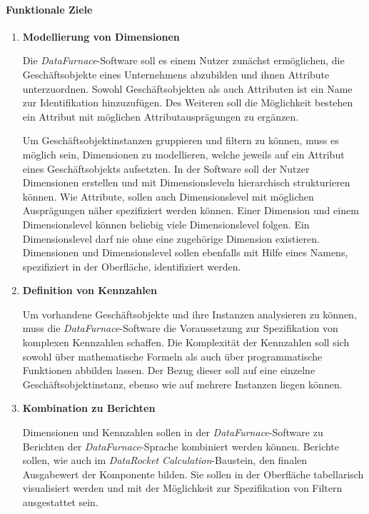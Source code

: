 \documentclass[
  language=german, %
  type=bachelor%
]{isthesis}
\begin{document}
\begin{content}
  \paragraph{Funktionale Ziele}
  \begin{enumerate}
    \item \textbf{Modellierung von Dimensionen}

      Die \textit{DataFurnace}-Software soll es einem Nutzer zunächst
      ermöglichen, die Geschäftsobjekte eines Unternehmens abzubilden und ihnen
      Attribute unterzuordnen. Sowohl Geschäftsobjekten als auch Attributen
      ist ein Name zur Identifikation hinzuzufügen. Des Weiteren soll die
      Möglichkeit bestehen ein Attribut mit möglichen Attributausprägungen zu
      ergänzen.

      Um Geschäftsobjektinstanzen gruppieren und filtern zu können, muss es
      möglich sein, Dimensionen zu modellieren, welche jeweils auf ein Attribut
      eines Geschäftsobjekts aufsetzten. In der Software soll der Nutzer
      Dimensionen erstellen und mit Dimensionsleveln hierarchisch strukturieren
      können. Wie Attribute, sollen auch Dimensionslevel mit möglichen
      Ausprägungen näher spezifiziert werden können. Einer Dimension und einem
      Dimensionslevel können beliebig viele Dimensionslevel folgen. Ein
      Dimensionslevel darf nie ohne eine zugehörige Dimension existieren.
      Dimensionen und Dimensionslevel sollen ebenfalls mit Hilfe eines Namens,
      spezifiziert in der Oberfläche, identifiziert werden.

    \item \textbf{Definition von Kennzahlen}

      Um vorhandene Geschäftsobjekte und ihre Instanzen analysieren zu können,
      muss die \textit{DataFurnace}-Software die Voraussetzung zur
      Spezifikation von komplexen Kennzahlen schaffen. Die Komplexität der
      Kennzahlen soll sich sowohl über mathematische Formeln als auch
      über programmatische Funktionen abbilden lassen. Der Bezug dieser soll auf
      eine einzelne Geschäftsobjektinstanz, ebenso wie auf mehrere Instanzen
      liegen können.

    \item \textbf{Kombination zu Berichten}

      Dimensionen und Kennzahlen sollen in der \textit{DataFurnace}-Software zu
      Berichten der \textit{DataFurnace}-Sprache kombiniert werden können.
      Berichte sollen, wie auch im \textit{DataRocket}
      \textit{Calculation}-Baustein, den finalen Ausgabewert der Komponente
      bilden. Sie sollen in der Oberfläche tabellarisch visualisiert werden und
      mit der Möglichkeit zur Spezifikation von Filtern ausgestattet sein.


\end{enumerate}
\end{content}
\end{document}
